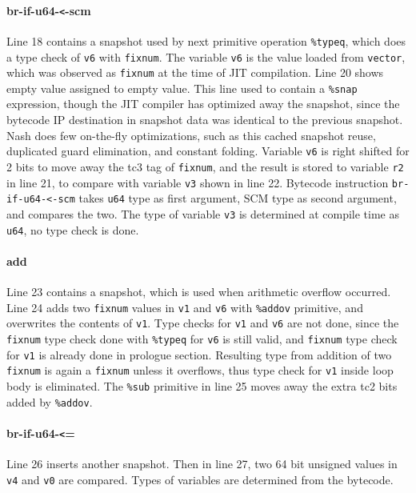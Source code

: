 \documentclass[preprint, 10pt]{sigplanconf}
\begin{document}
\paragraph{br-if-u64-\texttt{<}-scm} Line 18 contains a snapshot used by next
primitive operation \texttt{\%typeq}, which does a type check of \texttt{v6}
with \texttt{fixnum}. The variable \texttt{v6} is the value loaded from
\texttt{vector}, which was observed as \texttt{fixnum} at the time of JIT
compilation. Line 20 shows empty value assigned to empty value. This line used
to contain a \texttt{\%snap} expression, though the JIT compiler has optimized
away the snapshot, since the bytecode IP destination in snapshot data was
identical to the previous snapshot. Nash does few on-the-fly optimizations,
such as this cached snapshot reuse, duplicated guard elimination, and constant
folding.  Variable \texttt{v6} is right shifted for 2 bits to move away the
tc3 tag of \texttt{fixnum}, and the result is stored to variable \texttt{r2}
in line 21, to compare with variable \texttt{v3} shown in line 22. Bytecode
instruction \texttt{br-if-u64-<-scm} takes \texttt{u64} type as first
argument, SCM type as second argument, and compares the two. The type of
variable \texttt{v3} is determined at compile time as \texttt{u64}, no type
check is done.

\paragraph{add} Line 23 contains a snapshot, which is used
when arithmetic overflow occurred. Line 24 adds two \texttt{fixnum} values in
\texttt{v1} and \texttt{v6} with \texttt{\%addov} primitive, and overwrites
the contents of \texttt{v1}. Type checks for \texttt{v1} and \texttt{v6} are
not done, since the \texttt{fixnum} type check done with \texttt{\%typeq} for
\texttt{v6} is still valid, and \texttt{fixnum} type check for \texttt{v1} is
already done in prologue section. Resulting type from addition of two
\texttt{fixnum} is again a \texttt{fixnum} unless it overflows, thus type
check for \texttt{v1} inside loop body is eliminated. The \texttt{\%sub}
primitive in line 25 moves away the extra tc2 bits added by \texttt{\%addov}.

\paragraph{br-if-u64-\texttt{<}=} Line 26 inserts another snapshot. Then in line
27, two 64 bit unsigned values in \texttt{v4} and \texttt{v0} are
compared. Types of variables are determined from the bytecode.
\end{document}
